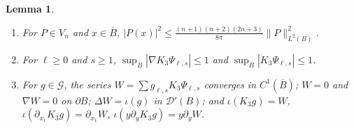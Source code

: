 \documentclass[11pt]{amsart}
\newtheorem{lemma}[theorem]{Lemma}
\theoremstyle{definition}
\theoremstyle{remark}
\numberwithin{equation}{section}
\newcommand{\Gc}{\mathcal{G}}
\newcommand{\nrm}[1]{\lVert #1\rVert}
\begin{document}
\begin{lemma}\label{r3:lem-C1}
\begin{enumerate}[label=\textup{(\alph*)}]
\item For $P\in V_n$ and $x\in\overline B$, $|P(x)|^2\leq\frac{(n+1)(n+2)(2n+3)}{8\pi}\nrm P^2_{L^2(B)}$.
\item For $\ell\geq0$ and $s\geq1$, $\sup_{\overline B}|\nabla K_3\Psi_{\ell,s}|\leq1$ and $\sup_{\overline B}|K_3\Psi_{\ell,s}|\leq1$.
\item For $g\in\Gc$, the series $W=\sum g_{\ell,s}K_3\Psi_{\ell,s}$ converges in $C^1(\overline B)$; $W=0$ and $\nabla W=0$ on $\partial B$; $\Delta W=\iota(g)$ in $\mathcal D'(B)$; and $\iota(K_3g)=W$, $\iota(\partial_{x_1}K_3g)=\partial_{x_1}W$, $\iota(y\partial_yK_3g)=y\partial_yW$.
\end{enumerate}
\end{lemma}
\end{document}
